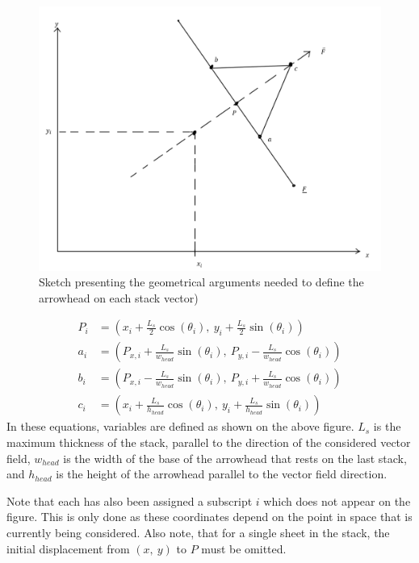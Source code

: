 \documentclass[11]{report}
\begin{document}
\begin{figure}[H]
	\centering
	\includegraphics[scale=0.3]{Documentation_images/Geometry of 1 stack sheet, displacement 2}
	\caption{Sketch presenting the geometrical arguments needed to define the arrowhead on each stack vector)}
	\label{fig:arrowhead gometry}
\end{figure}
\begin{align*}
P_i &= \left( x_i + \frac{L_s}{2} \cos( \theta_i) , \  y_i + \frac{L_s}{2} \sin( \theta_i) \right) \\
a_i &= \left( P_{x, i} + \frac{L_s}{w_{head}} \sin( \theta_i) , \  P_{y, i} - \frac{L_s}{w_{head}} \cos( \theta_i) \right)\\
b_i &= \left( P_{x, i} - \frac{L_s}{w_{head}} \sin( \theta_i) , \  P_{y, i} + \frac{L_s}{w_{head}} \cos( \theta_i) \right)\\ 
c_i &= \left( x_i + \frac{L_s}{h_{head}} \cos( \theta_i) , \  y_i + \frac{L_s}{h_{head}} \sin( \theta_i) \right)
\end{align*}
\noindent In these equations, variables are defined as shown on the above figure. \( L_s \) is the maximum thickness of the stack, parallel to the direction of the considered vector field, \( w_{head} \) is the width of the base of the arrowhead that rests on the last stack, and \( h_{head} \) is the height of the arrowhead parallel to the vector field direction.

Note that each has also been assigned a subscript \( i \) which does not appear on the figure. This is only done as these coordinates depend on the point in space that is currently being considered. Also note, that for a single sheet in the stack, the initial displacement from \( (x, \ y )\) to \( P \) must be omitted.
\end{document}
